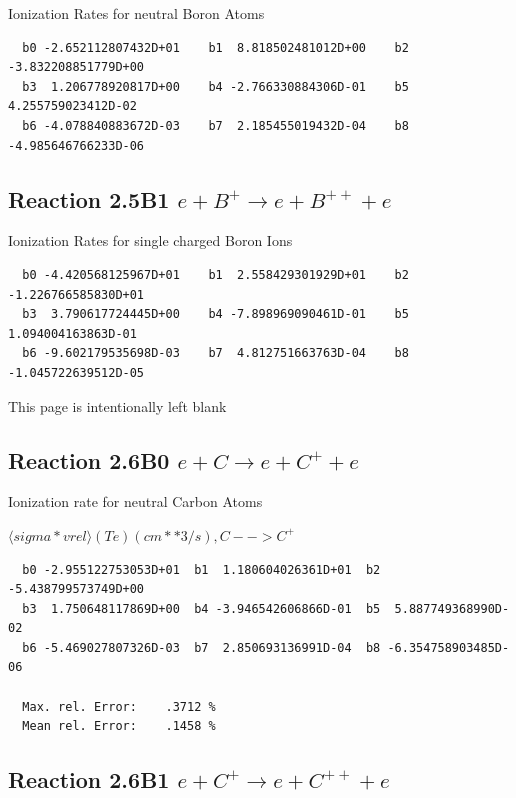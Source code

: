 \documentclass[12pt,dvips]{article}
\begin{document}
 Ionization Rates for neutral Boron Atoms


\begin{small}\begin{verbatim}
  b0 -2.652112807432D+01    b1  8.818502481012D+00    b2 -3.832208851779D+00
  b3  1.206778920817D+00    b4 -2.766330884306D-01    b5  4.255759023412D-02
  b6 -4.078840883672D-03    b7  2.185455019432D-04    b8 -4.985646766233D-06
\end{verbatim}\end{small}

\subsection{
Reaction 2.5B1   $e + B^+ \rightarrow e + B^{++} + e $
}

 Ionization Rates for single charged Boron Ions


\begin{small}\begin{verbatim}
  b0 -4.420568125967D+01    b1  2.558429301929D+01    b2 -1.226766585830D+01
  b3  3.790617724445D+00    b4 -7.898969090461D-01    b5  1.094004163863D-01
  b6 -9.602179535698D-03    b7  4.812751663763D-04    b8 -1.045722639512D-05
\end{verbatim}\end{small}

\newpage
This page is intentionally left blank
\newpage

\subsection{
Reaction 2.6B0   $e + C \rightarrow e + C^+ + e  $
}

  Ionization rate for neutral Carbon Atoms

  $ \langle sigma*vrel \rangle(Te)  (cm**3/s), C --> C^+$

\begin{small}\begin{verbatim}
  b0 -2.955122753053D+01  b1  1.180604026361D+01  b2 -5.438799573749D+00
  b3  1.750648117869D+00  b4 -3.946542606866D-01  b5  5.887749368990D-02
  b6 -5.469027807326D-03  b7  2.850693136991D-04  b8 -6.354758903485D-06

  Max. rel. Error:    .3712 %
  Mean rel. Error:    .1458 %

\end{verbatim}\end{small}
\subsection{
Reaction 2.6B1   $e + C^+ \rightarrow e + C^{++} + e  $
}
\end{document}
